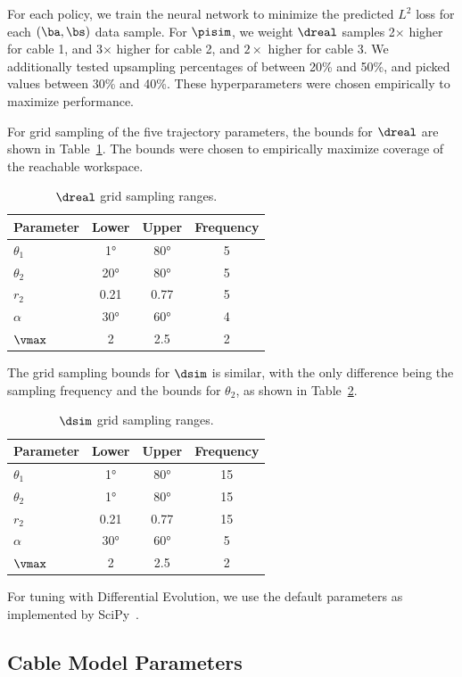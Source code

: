 For each policy, we train the neural network to minimize the predicted $L^2$ loss for each $(\ba, \bs)$ data sample. For $\pisim$, we weight $\dreal$ samples 2$\times$ higher for cable 1, and 3$\times$ higher for cable 2, and $2\times$ higher for cable 3. We additionally tested upsampling percentages of between 20\% and 50\%, and picked values between 30\% and 40\%. These hyperparameters were chosen empirically to maximize performance. 

For grid sampling of the five trajectory parameters, the bounds for $\dreal$ are shown in Table~\ref{tab:dphys_samp}. The bounds were chosen to empirically maximize coverage of the reachable workspace.

\begin{table}[H]
  \setlength\tabcolsep{5.0pt}
  \centering
  \normalsize
  \begin{tabular}{@{}lccc@{}}
  \toprule
  Parameter & Lower & Upper & Frequency \\
  \midrule
  $\theta_1$ & \ang{1} & \ang{80} & 5 \\
  $\theta_2$ & \ang{20} & \ang{80} & 5 \\
  $r_2$ & 0.21 & 0.77 & 5 \\
  $\alpha$ & \ang{30} & \ang{60} & 4 \\
  $\vmax$ & 2 & 2.5 & 2 \\
  \toprule
  \end{tabular}
  \caption{$\dreal$ grid sampling ranges.}
  \label{tab:dphys_samp}
\end{table}

The grid sampling bounds for $\dsim$ is similar, with the only difference being the sampling frequency and the bounds for $\theta_2$, as shown in Table~\ref{tab:dsim_samp}.

\begin{table}[H]
  \setlength\tabcolsep{5.0pt}
  \centering
  \normalsize
  \begin{tabular}{@{}lccc@{}}
  \toprule
  Parameter & Lower & Upper & Frequency \\
  \midrule
  $\theta_1$ & \ang{1} & \ang{80} & 15 \\
  $\theta_2$ & \ang{1} & \ang{80} & 15 \\
  $r_2$ & 0.21 & 0.77 & 15 \\
  $\alpha$ & \ang{30} & \ang{60} & 5 \\
  $\vmax$ & 2 & 2.5 & 2 \\
  \toprule
  \end{tabular}
  \caption{$\dsim$ grid sampling ranges.}
  \label{tab:dsim_samp}
\end{table}

For tuning with Differential Evolution, we use the default parameters as implemented by SciPy~\cite{2020SciPy-NMeth}.

\subsection{Cable Model Parameters} \label{app:cable}


